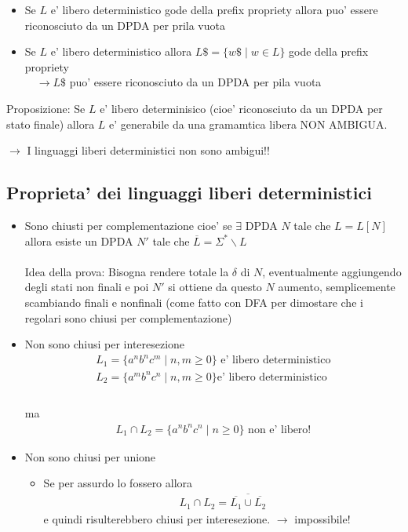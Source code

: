 \documentclass[a4paper,12pt]{article}
\begin{document}
{\begin{itemize}
  \item Se $L$ e' libero deterministico gode della prefix propriety allora puo' essere riconosciuto da un DPDA per prila vuota
  \item Se $L$ e' libero deterministico allora $L \mathdollar = \{w \mathdollar \mid w \in L\}$ gode della prefix propriety \\
  $\quad \to L \mathdollar$ puo' essere riconosciuto da un DPDA per pila vuota
\end{itemize} 
\vspace{1em}
Proposizione: Se $L$ e' libero determinisico (cioe' riconosciuto da un DPDA per stato finale) allora $L$ e' generabile da una gramamtica libera NON AMBIGUA.
\begin{center}
  $\to$ I linguaggi liberi deterministici non sono ambigui!!
\end{center}
\subsection{Proprieta' dei linguaggi liberi deterministici}
\begin{itemize}
  \item Sono chiusti per complementazione cioe' se $\exists $ DPDA $N$ tale che $L = L[N]$ allora esiste un DPDA $N'$ tale che $\overline{L} = \Sigma^* \backslash L$ \\
  \vspace{1em} \\
  Idea della prova: Bisogna rendere totale la $\delta$ di $N$, eventualmente aggiungendo degli stati non finali e poi $N'$ si ottiene da questo $N$ aumento, semplicemente scambiando finali e nonfinali (come fatto con DFA per dimostare che i regolari sono chiusi per complementazione)
  \item Non sono chiusi per interesezione 
  \begin{align*}
    L_1 = \{a^n b^n c^m \mid n,m \geq 0\} \text{ e' libero deterministico} \\
    L_2 = \{a^m b^n c^n \mid n,m \geq 0\} \text{e' libero deterministico} \\
  \end{align*} \\
  ma 
  \begin{align*}
    L_1 \cap L_2 = \{a^n b^n c^n \mid n \geq 0\} \text{ non e' libero!}
  \end{align*}
  \item Non sono chiusi per unione \\
  \begin{itemize}
    \item Se per assurdo lo fossero allora
    \begin{align*}
      L_1 \cap L_2 = \overline{\overline{L_1} \cup \overline{L_2}}
    \end{align*}
    e quindi risulterebbero chiusi per interesezione. $\to$ impossibile!
  \end{itemize}
\end{itemize}
}
\end{document}
